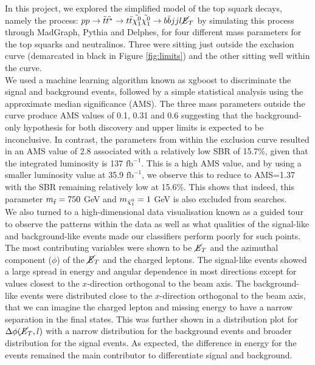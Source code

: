 \vspace{-0.5cm}
In this project, we explored the simplified model of the top squark decays, namely the process: $pp \rightarrow \Tilde{t}\Tilde{t^*} \rightarrow t \Bar{t} \Tilde{\chi^0_1}\Tilde{\chi^0_1} \rightarrow b\Bar{b}jjl\cancel{\it{E}}_{T}$ by simulating this process through MadGraph, Pythia and Delphes, for four different mass parameters for the top squarks and neutralinos. Three were sitting just outside the exclusion curve (demarcated in black in Figure \ref{fig:limits}) and the other sitting well within the curve. \\

We used a machine learning algorithm known as xgboost to discriminate the signal and background events, followed by a simple statistical analysis using the approximate median significance (AMS). The three mass parameters outside the curve produce AMS values of 0.1, 0.31 and 0.6 suggesting that the background-only hypothesis for both discovery and upper limits is expected to be inconclusive. In contrast, the parameters from within the exclusion curve resulted in an AMS value of 2.8 associated with a relatively low SBR of 15.7\%, given that the integrated luminosity is 137 $\text{fb}^{-1}$. This is a high AMS value, and by using a smaller luminosity value at 35.9 $\text{fb}^{-1}$, we observe this to reduce to AMS=1.37 with the SBR remaining relatively low at 15.6\%. This shows that indeed, this parameter $m_{\Tilde{t}} = 750$ GeV and $m_{\Tilde{\chi}_1^0} = 1$ GeV is also excluded from searches. \\

We also turned to a high-dimensional data visualisation known as a guided tour to observe the patterns within the data as well as what qualities of the signal-like and background-like events made our classifiers perform poorly for such points. The most contributing variables were shown to be $\cancel{\it{E}}_{T}$ and the azimuthal component ($\phi$) of the $\cancel{\it{E}}_{T}$ and the charged leptons. The signal-like events showed a large spread in energy and angular dependence in most directions except for values closest to the $x$-direction orthogonal to the beam axis. The background-like events were distributed close to the $x$-direction orthogonal to the beam axis, that we can imagine the charged lepton and missing energy to have a narrow separation in the final states. This was further shown in a distribution plot for $\Delta \phi(\cancel{\it{E}}_{T},l)$ with a narrow distribution for the background events and broader distribution for the signal events. As expected, the difference in energy for the events remained the main contributor to differentiate signal and background. \\

